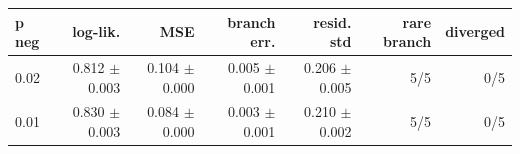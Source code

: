 \begin{tabular}{lrrrrrr}
\toprule
p neg & log-lik. & MSE & branch err. & resid. std & rare branch & diverged \\
\midrule
0.02 & 0.812 $\pm$ 0.003 & 0.104 $\pm$ 0.000 & 0.005 $\pm$ 0.001 & 0.206 $\pm$ 0.005 & 5/5 & 0/5 \\
0.01 & 0.830 $\pm$ 0.003 & 0.084 $\pm$ 0.000 & 0.003 $\pm$ 0.001 & 0.210 $\pm$ 0.002 & 5/5 & 0/5 \\
\bottomrule
\end{tabular}
